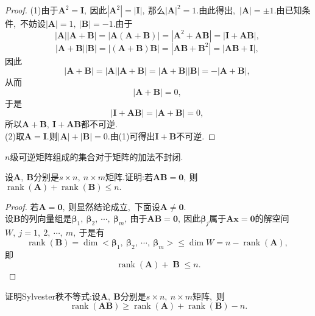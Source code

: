 \begin{proof}
	(1)由于$\boldsymbol{A}^2=\boldsymbol{I},\ $因此$|\boldsymbol{A}^2|=|\boldsymbol{I}|,\ $那么$|\boldsymbol{A}|^2=1.$由此得出,\ $|\boldsymbol{A}|=\pm 1.$由已知条件,\ 不妨设$|\boldsymbol{A}|=1,\ |\boldsymbol{B}|=-1.$由于
	$$|\boldsymbol{A}||\boldsymbol{A}+\boldsymbol{B}|=|\boldsymbol{A}(\boldsymbol{A}+\boldsymbol{B})|=|\boldsymbol{A}^2+\boldsymbol{AB}|=|\boldsymbol{I}+\boldsymbol{AB}|,\ $$
	$$|\boldsymbol{A+B}||\boldsymbol{B}|=|(\boldsymbol{A}+\boldsymbol{B})\boldsymbol{B}|=|\boldsymbol{AB}+\boldsymbol{B}^2|=|\boldsymbol{AB}+\boldsymbol{I}|,\ $$
	因此
	$$|\boldsymbol{A+B}|=|\boldsymbol{A}||\boldsymbol{A+B}|=|\boldsymbol{A+B}||\boldsymbol{B}|=-|\boldsymbol{A+B}|,\ $$
	从而
	$$|\boldsymbol{A+B}|=0,\ $$
	于是
	$$|\boldsymbol{I}+\boldsymbol{AB}|=|\boldsymbol{A+B}|=0,\ $$
	所以$\boldsymbol{A+B},\ \boldsymbol{I}+\boldsymbol{AB}$都不可逆.\\
	(2)取$\boldsymbol{A}=\boldsymbol{I}.$则$|\boldsymbol{A}|+|\boldsymbol{B}|=0.$由(1)可得出$\boldsymbol{I}+\boldsymbol{B}$不可逆.
\end{proof}
\begin{note}
	$n$级可逆矩阵组成的集合对于矩阵的加法不封闭.
\end{note}
\newpage
\begin{problem}
	设$\boldsymbol{A},\ \boldsymbol{B}$分别是$s\times n,\ n\times m$矩阵.证明:若$\boldsymbol{AB}=\boldsymbol{0},\ $则$\operatorname{rank}(\boldsymbol{A})+\operatorname{rank}(\boldsymbol{B})\leqslant n.$
\end{problem}
\begin{proof}
	若$\boldsymbol{A}=\boldsymbol{0},\ $则显然结论成立,\ 下面设$\boldsymbol{A}\neq \boldsymbol{0}.$\\
	设$\boldsymbol{B}$的列向量组是$\boldsymbol{\beta}_1,\ \boldsymbol{\beta}_2,\ \cdots,\ \boldsymbol{\beta}_m,\ $由于$\boldsymbol{AB}=\boldsymbol{0},\ $因此$\boldsymbol{\beta}_j$属于$\boldsymbol{Ax}=\boldsymbol{0}$的解空间$W,\ j=1,\ 2,\ \cdots,\ m,\ $于是有
	$$\operatorname{rank}(\boldsymbol{B})=\operatorname{dim}<\boldsymbol{\beta}_1,\ \boldsymbol{\beta}_2,\ \cdots,\ \boldsymbol{\beta}_m>\leqslant\operatorname{dim}W=n-\operatorname{rank}(\boldsymbol{A}),\ $$
	即
	$$\operatorname{rank}(\boldsymbol{A})+\operatorname{\boldsymbol{B}}\leqslant n.$$
\end{proof}
\newpage
\begin{problem}
	证明Sylvester秩不等式:设$\boldsymbol{A},\ \boldsymbol{B}$分别是$s\times n,\ n\times m$矩阵,\ 则
	$$\operatorname{rank}(\boldsymbol{AB})\geqslant\operatorname{rank}(\boldsymbol{A})+\operatorname{rank}(\boldsymbol{B})-n.$$
\end{problem}
